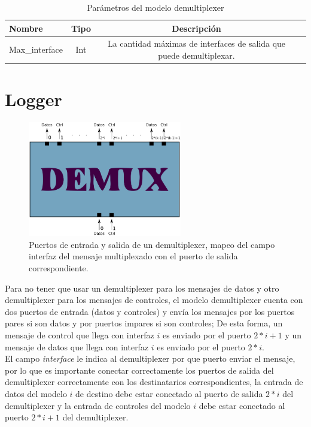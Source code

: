 \documentclass[10pt,a4paper]{article}
\begin{document}
\begin{table}[h]
	\begin{tabular}{|l|c|c|c|}
  		\hline
  		Nombre & Tipo & Descripción \\
  		\hline
  		Max\_interface & Int & La cantidad máximas de interfaces de salida que puede demultiplexar. \\
  		\hline
	\end{tabular}
	\caption{Parámetros del modelo demultiplexer}
	\label{table: parameter demultiplexer}
\end{table}

\section{Logger}

\begin{figure}[htbp]
    \centering
    \includegraphics[width = 0.6\textwidth]{img/png/demultiplexer.png}
    \caption{Puertos de entrada y salida de un demultiplexer, mapeo del campo interfaz del mensaje multiplexado con el puerto de salida correspondiente.}
    \label{figure: demultiplexer}
\end{figure}

Para no tener que usar un demultiplexer para los mensajes de datos y otro demultiplexer para los mensajes de controles, el modelo demultiplexer cuenta con dos puertos de entrada (datos y controles) y envía los mensajes por los puertos pares si son datos y por puertos impares si son controles; De esta forma, un mensaje de control que llega con interfaz $i$ es enviado por el puerto $2*i+1$ y un mensaje de datos que llega con interfaz $i$ es enviado por el puerto $2*i$. \\

El campo \textit{interface} le indica al demultiplexer por que puerto enviar el mensaje, por lo que es importante conectar correctamente los puertos de salida del demultiplexer correctamente con los destinatarios correspondientes, la entrada de datos del modelo $i$ de destino debe estar conectado al puerto de salida $2*i$ del demultiplexer y la entrada de controles del modelo $i$ debe estar conectado al puerto $2*i+1$ del demultiplexer. \\
\end{document}
